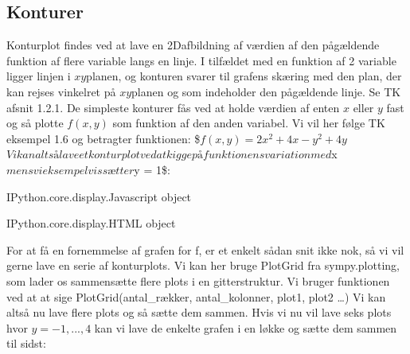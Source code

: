 \documentclass[letterpaper,10pt,english]{jupyterBook}
\begin{document}
\subsection{Konturer}
\label{\detokenize{notebooks/sympy/Notebook_FlereVar_analyse:konturer}}
Konturplot findes ved at lave en 2D\sphinxhyphen{}afbildning af værdien af den pågældende funktion af flere variable langs en linje. I tilfældet med en funktion af 2 variable ligger linjen i \(xy\)\sphinxhyphen{}planen, og konturen svarer til grafens skæring med den plan, der kan rejses vinkelret på \(xy\)\sphinxhyphen{}planen og som indeholder den pågældende linje. Se TK afsnit 1.2.1. De simpleste konturer fås ved at holde værdien af enten \(x\) eller \(y\) fast og så plotte \(f(x,y)\) som funktion af den anden variabel. Vi vil her følge TK eksempel 1.6 og betragter funktionen:
\$\(f(x,y) = 2x^2+ 4x - y^2 + 4y\)\(
Vi kan altså lave et konturplot ved at kigge på funktionens variation med \)x\( mens vi eksempelvis sætter \)y = 1\$:

\begin{sphinxVerbatim}[commandchars=\\\{\}]
   

                  

    
\end{sphinxVerbatim}

\begin{sphinxVerbatim}[commandchars=\\\{\}]
\PYGZlt{}IPython.core.display.Javascript object\PYGZgt{}
\end{sphinxVerbatim}

\begin{sphinxVerbatim}[commandchars=\\\{\}]
\PYGZlt{}IPython.core.display.HTML object\PYGZgt{}
\end{sphinxVerbatim}

For at få en fornemmelse af grafen for f, er et enkelt sådan snit ikke nok, så vi vil gerne lave en serie af konturplots. Vi kan her bruge PlotGrid fra sympy.plotting, som lader os sammensætte flere plots i en gitterstruktur. Vi bruger funktionen ved at at sige PlotGrid(antal\_rækker, antal\_kolonner, plot1, plot2 …)
Vi kan altså nu lave flere plots og så sætte dem sammen. Hvis vi nu vil lave seks plots hvor \(y = -1,...,4\) kan vi lave de enkelte grafen i en løkke og sætte dem sammen til sidst:
\end{document}
